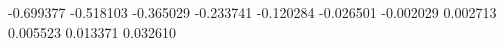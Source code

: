 -0.699377
-0.518103
-0.365029
-0.233741
-0.120284
-0.026501
-0.002029
0.002713
0.005523
0.013371
0.032610
